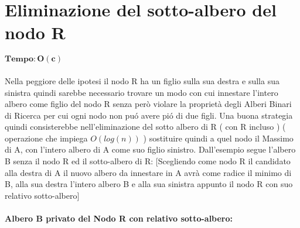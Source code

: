 \section{Eliminazione del sotto-albero del nodo R}
$\mathbf{Tempo: O(c)}$\\ 	\\
Nella peggiore delle ipotesi il nodo R ha un figlio sulla sua destra e sulla sua sinistra quindi sarebbe necessario trovare un modo con cui innestare l'intero albero come figlio del nodo R senza però violare la proprietà degli Alberi Binari di Ricerca per cui ogni nodo non pu\'o avere pi\'o di due figli. Una buona strategia quindi consisterebbe nell'eliminazione del sotto albero di R ( con R incluso ) ( operazione che impiega $O(log(n))$ ) sostituire quindi a quel nodo il Massimo di A, con l'intero albero di A come suo figlio sinistro.
Dall'esempio segue l'albero B senza il nodo R ed il sotto-albero di R:
[Scegliendo come nodo R il candidato alla destra di A il nuovo albero da innestare in A avrà come radice il minimo di B, alla sua destra l'intero albero B e alla sua sinistra appunto il nodo R con suo relativo sotto-albero]
\newpage

\paragraph{Albero B privato del Nodo R con relativo sotto-albero: \newline \newline}


